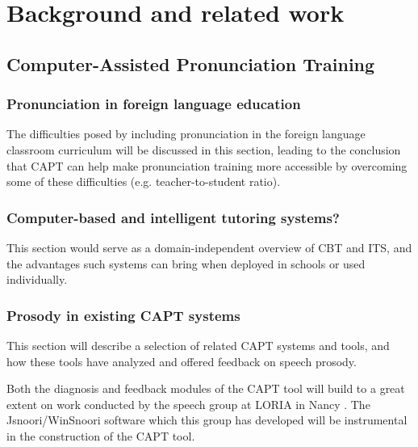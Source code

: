 %
%
\chapter{Background and related work}
\label{chap:background}





\section{Computer-Assisted Pronunciation Training} %
\label{sec:bkgd:capt}

	\citep{Eskenazi2009,Delmonte2011,Witt2012}

	\subsection{Pronunciation in foreign language education}
	\label{sec:capt:l2ed}
	
	The difficulties posed by including pronunciation in the foreign language classroom curriculum will be discussed in this section, leading to the conclusion that CAPT can help make pronunciation training more accessible by overcoming some of these difficulties (e.g. teacher-to-student ratio).


	\subsection{Computer-based and intelligent tutoring systems?} 
	\label{sec:capt:its}
	
	This section would serve as a domain-independent overview of CBT and ITS, and the advantages such systems can bring when deployed in schools or used individually.
	
	\subsection{Prosody in existing CAPT systems}
	\label{sec:capt:systems}
	
	This section will describe a selection of related CAPT systems and tools, and how these tools have analyzed and offered feedback on speech prosody.
	
	Both the diagnosis and feedback modules of the CAPT tool will build to a great extent on work conducted by the speech group at LORIA in Nancy \citep{Bonneau2011,Fohr1996,Fohr2012,Mesbahi2011,Orosanu2012}. The Jsnoori/WinSnoori software \citep{Parole2013} %
which this group has developed will be instrumental in the construction of the CAPT tool. 
	
